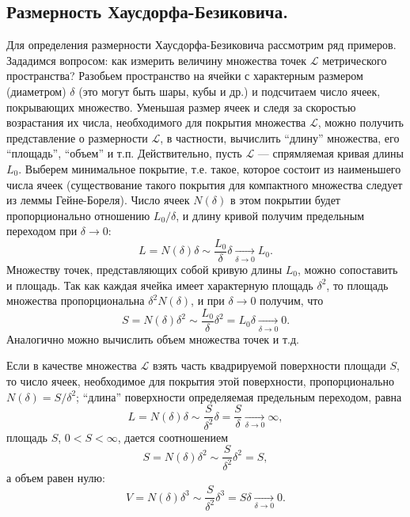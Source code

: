 \subsection{Размерность Хаусдорфа-Безиковича.}
Для определения размерности Хаусдорфа-Безиковича рассмотрим ряд примеров. Зададимся вопросом: как измерить величину множества точек $\mathcal{L}$ метрического пространства? Разобьем пространство на ячейки с характерным размером (диаметром) $\delta$ (это могут быть шары, кубы и др.) и подсчитаем число ячеек, покрывающих множество. Уменьшая размер ячеек и следя за скоростью возрастания их числа, необходимого для покрытия множества $\mathcal{L}$, можно получить представление о размерности $\mathcal{L}$, в частности, вычислить ``длину'' множества, его ``площадь'', ``объем'' и т.п. Действительно, пусть $\mathcal{L}$ --- спрямляемая кривая длины $L_{0}$. Выберем минимальное покрытие, т.е. такое, которое состоит из наименьшего числа ячеек (существование такого покрытия для компактного множества следует из леммы Гейне-Бореля). Число ячеек $N(\delta)$ в этом покрытии будет пропорционально отношению $L_{0}/\delta$, и длину кривой получим предельным переходом при $\delta \rightarrow 0$:
\begin{equation*}
    L = N(\delta)\delta \sim \dfrac{L_{0}}{\delta}\delta \xrightarrow[\delta \rightarrow 0]{} L_{0}.
\end{equation*}
Множеству точек, представляющих собой кривую длины $L_{0}$, можно сопоставить и площадь. Так как каждая ячейка имеет характерную площадь $\delta^2$, то площадь множества пропорциональна $\delta^2 N(\delta)$, и при $\delta \rightarrow 0$ получим, что
\begin{equation*}
    S = N(\delta) \delta^2 \sim \dfrac{L_{0}}{\delta}\delta^2 = L_{0} \delta \xrightarrow[\delta \rightarrow 0]{}0.
\end{equation*}
Аналогично можно вычислить объем множества точек и т.д.

Если в качестве множества $\mathcal{L}$ взять часть квадрируемой поверхности площади $S$, то число ячеек, необходимое для покрытия этой поверхности, пропорционально $N(\delta) = S/\delta^2$; ``длина'' поверхности определяемая предельным переходом, равна
\begin{equation*}
    L = N(\delta) \delta \sim \dfrac{S}{\delta^2}\delta = \dfrac{S}{\delta} \xrightarrow[\delta \rightarrow 0]{} \infty,
\end{equation*}
площадь $S$, $0 < S < \infty$, дается соотношением
\begin{equation*}
    S = N(\delta) \delta^2 \sim \dfrac{S}{\delta^2}\delta^2 = S,
\end{equation*}
а объем равен нулю:
\begin{equation*}
    V = N(\delta) \delta^3 \sim \dfrac{S}{\delta^2}\delta^3 = S \delta \xrightarrow[\delta \rightarrow 0]{}0.
\end{equation*}

